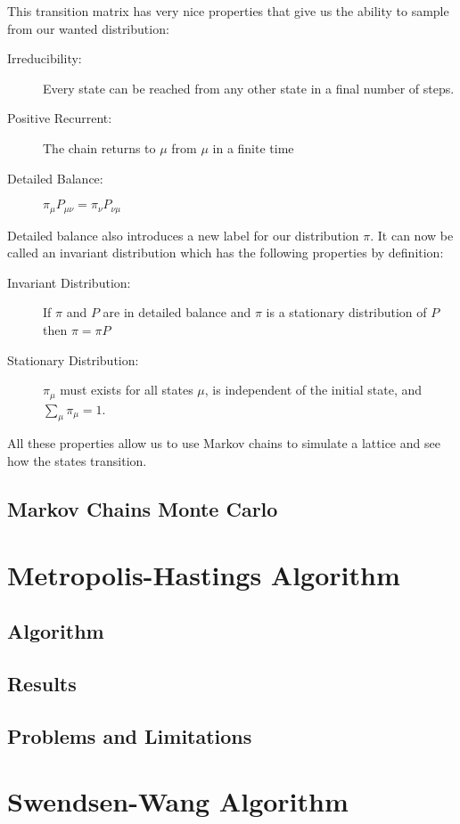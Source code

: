 \documentclass[a4]{scrartcl}
\begin{document}
This transition matrix has very nice properties that give us the ability to
sample from our wanted distribution:
\begin{description}
	\item[Irreducibility:] Every state can be reached from any other state in a final number of steps.
	\item[Positive Recurrent:] The chain returns to $\mu$ from $\mu$ in a finite time
	\item[Detailed Balance:] $ \pi_\mu P_{\mu \nu} = \pi_\nu P_{\nu \mu} $
\end{description}
Detailed balance also introduces a new label for our distribution $\pi$. It can
now be called an invariant distribution which has the following properties by
definition:
\begin{description}
	\item[Invariant Distribution:] If $\pi$ and $P$ are in detailed balance and $\pi$ is a stationary distribution of $P$ then $\pi = \pi P$
	\item[Stationary Distribution:] $\pi_\mu$ must exists for all states $\mu$, is independent of the initial state, and $ \sum_\mu \pi_\mu = 1 $. 
\end{description}

All these properties allow us to use Markov chains to simulate a lattice and
see how the states transition.
\subsection{Markov Chains Monte Carlo}
	

\section{Metropolis-Hastings Algorithm}
\subsection{Algorithm}

\subsection{Results}

\subsection{Problems and Limitations}

\section{Swendsen-Wang Algorithm}
\end{document}
